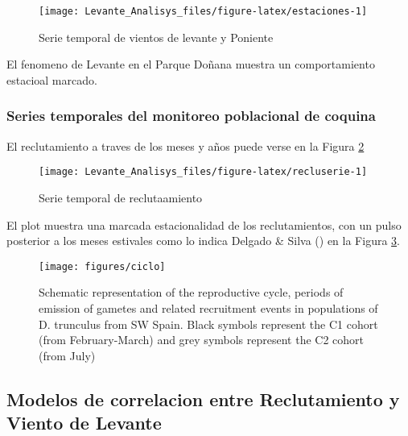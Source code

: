 \documentclass[
]{article}
\begin{document}
\begin{figure}

{\centering \texttt{[image: Levante\_Analisys\_files/figure-latex/estaciones-1]} 

}

\caption{Serie temporal de vientos de levante y Poniente}\label{fig:estaciones}
\end{figure}

El fenomeno de Levante en el Parque Doñana muestra un comportamiento estacioal marcado.

\newpage

\subsubsection{Series temporales del monitoreo poblacional de coquina}\label{series-temporales-del-monitoreo-poblacional-de-coquina}

El reclutamiento a traves de los meses y años puede verse en la Figura \ref{fig:recluserie}

\begin{figure}

{\centering \texttt{[image: Levante\_Analisys\_files/figure-latex/recluserie-1]} 

}

\caption{Serie temporal de reclutaamiento}\label{fig:recluserie}
\end{figure}

El plot muestra una marcada estacionalidad de los reclutamientos, con un pulso posterior a los meses estivales como lo indica Delgado \& Silva () en la Figura \ref{fig:ciclo}.

\begin{figure}

{\centering \texttt{[image: figures/ciclo]} 

}

\caption{Schematic representation of the reproductive cycle, periods of emission of gametes and related recruitment events in populations of D. trunculus from SW Spain. Black symbols represent the C1 cohort (from February-March) and grey symbols represent the C2 cohort (from July)}\label{fig:ciclo}
\end{figure}
\newpage

\subsection{Modelos de correlacion entre Reclutamiento y Viento de Levante}\label{modelos-de-correlacion-entre-reclutamiento-y-viento-de-levante}
\end{document}
